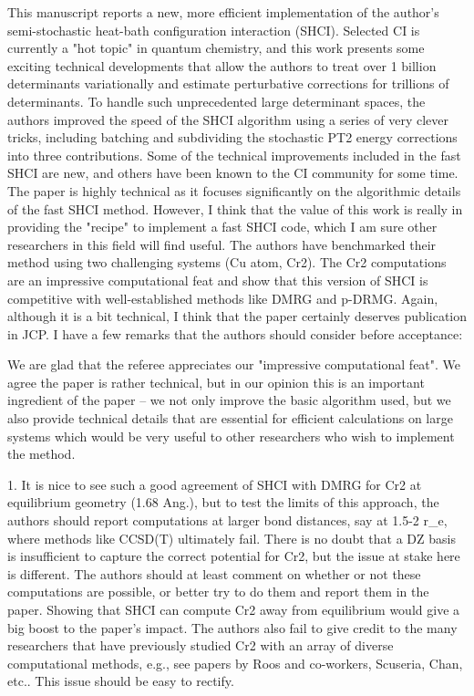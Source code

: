 \documentclass[
preprint,
onecolumn,
 superscriptaddress,
 amsmath,amssymb,
 aps,
]{revtex4-1}
\begin{document}
\vskip 5mm {\color{blue}
This manuscript reports a new, more efficient implementation of the author's semi-stochastic
heat-bath configuration interaction (SHCI). Selected CI is currently a "hot topic" in quantum
chemistry, and this work presents some exciting technical developments that allow the authors
to treat over 1 billion determinants variationally and estimate perturbative corrections for
trillions of determinants. To handle such unprecedented large determinant spaces, the authors
improved the speed of the SHCI algorithm using a series of very clever tricks, including
batching and subdividing the stochastic PT2 energy corrections into three contributions. Some
of the technical improvements included in the fast SHCI are new, and others have been known
to the CI community for some time. The paper is highly technical as it focuses significantly
on the algorithmic details of the fast SHCI method. However, I think that the value of this
work is really in providing the "recipe" to implement a fast SHCI code, which I am sure other
researchers in this field will find useful. The authors have benchmarked their method using
two challenging systems (Cu atom, Cr2). The Cr2 computations are an impressive computational
feat and show that this version of SHCI is competitive with well-established methods like DMRG
and p-DRMG. Again, although it is a bit technical, I think that the paper certainly deserves
publication in JCP. I have a few remarks that the authors should consider before acceptance:
}\color{black}

We are glad that the referee appreciates our "impressive computational feat".  We agree the
paper is rather technical, but in our opinion
this is an important ingredient of the paper -- we not only improve the basic algorithm used,
but we also provide technical details that
are essential for efficient calculations on large systems which would be very useful to other
researchers who wish
to implement the method.

\vskip 5mm {\color{blue}
1. It is nice to see such a good agreement of SHCI with DMRG for Cr2 at equilibrium geometry
(1.68 Ang.), but to test the limits of this approach, the authors should report computations
at larger bond distances, say at 1.5-2 r\_e, where methods like CCSD(T) ultimately fail. There
is no doubt that a DZ basis is insufficient to capture the correct potential for Cr2, but the
issue at stake here is different. The authors should at least comment on whether or not these
computations are possible, or better try to do them and report them in the paper. Showing that
SHCI can compute Cr2 away from equilibrium would give a big boost to the paper's impact. The
authors also fail to give credit to the many researchers that have previously studied Cr2 with
an array of diverse computational methods, e.g., see papers by Roos and co-workers, Scuseria,
Chan, etc.. This issue should be easy to rectify.
}\color{black}
\end{document}
